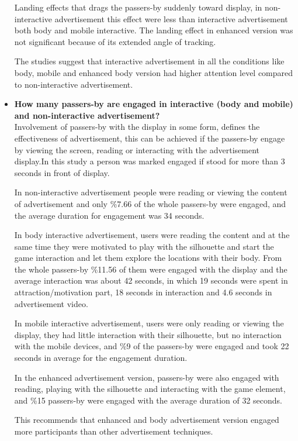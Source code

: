 \begin{itemize}
Landing effects that drags the passers-by suddenly toward display, in non-interactive advertisement this effect were less than interactive advertisement both body and mobile interactive. The landing effect in enhanced version was not significant because of its extended angle of tracking.
\fi


The studies suggest that interactive advertisement in all the conditions like body, mobile and enhanced body version had higher attention level compared to non-interactive advertisement. 

\item \textbf{How many passers-by are engaged in interactive (body and mobile) and non-interactive advertisement?} \\
Involvement of passers-by with the display in some form, defines the effectiveness of advertisement, this can be achieved if the passers-by engage by viewing the screen, reading or interacting with the advertisement display.In this study a person was marked engaged if stood for more than 3 seconds in front of display.

In non-interactive advertisement people were reading or viewing the content of advertisement and only \%7.66 of the whole passers-by were engaged, and the average duration for engagement was 34 seconds.

In body interactive advertisement, users were reading the content and at the same time they were motivated to play with the silhouette and start the game interaction and let them explore the locations with their body. From the whole passers-by \%11.56 of them were engaged with the display and the average interaction was about 42 seconds, in which 19 seconds were spent in attraction/motivation part, 18 seconds in interaction and 4.6 seconds in advertisement video.

In mobile interactive advertisement, users were only reading or viewing the display, they had little interaction with their silhouette, but no interaction with the mobile devices, and \%9 of the passers-by were engaged and took 22 seconds in average for the engagement duration.

In the enhanced advertisement version, passers-by were also engaged with reading, playing with the silhouette and interacting with the game element, and \%15 passers-by were engaged with the average duration of 32 seconds. 

This recommends that enhanced and body advertisement version engaged more participants than other advertisement techniques.




\end{itemize}
